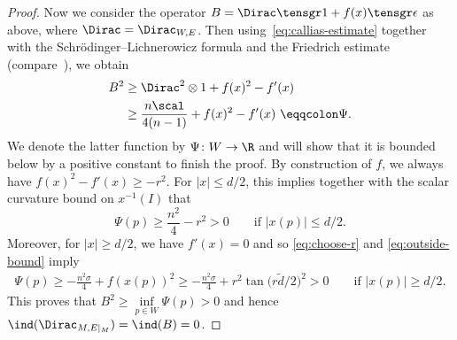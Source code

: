 \begin{proof}
 Now we consider the operator
 \(
 B = \Dirac \tensgr 1 + f(x) \tensgr \epsilon
 \)
 as above, where \(\Dirac = \Dirac_{W,E}\).
 Then \linebreak using~\eqref{eq:callias-estimate} together with the Schr\"odinger--Lichnerowicz formula and the Friedrich estimate (compare~\cite[Section~3.2]{Cecchini:LongNeck}), we obtain
 \begin{align*}
 B^2 &\geq \Dirac^2 \otimes 1 + f(x)^2 - f'(x) \\
 &\geq {\frac{n \scal}{4(n-1)} + f(x)^2 - f'(x)}\ \eqqcolon \Psi.
 \end{align*}
 We denote the latter function by \(\Psi \colon W \to \R\) and will show that it is bounded below by a positive constant to finish the proof.
 By construction of \(f\), we always have \(f(x)^2 - f'(x) \geq -r^2\).
 For \(|x| \leq d/2\), this implies together with the scalar curvature bound on \(x^{-1}(I)\) that
 \[
 \Psi(p) \geq \frac{n^2}{4} - r^2 > 0 \qquad \text{if \(|x(p)| \leq d/2\).}
 \]
 Moreover, for \(|x| \geq d/2\), we have \(f'(x) = 0\) and so \eqref{eq:choose-r} and \eqref{eq:outside-bound} imply
 \begin{align*}
\Psi(p) \geq - \frac{n^2 \sigma}{4} + f(x(p))^2 \geq - \frac{n^2 \sigma}{4} + r^2 \tan\big(r \tilde{d} / 2\big)^2 > 0 \qquad \text{if \(|x(p)| \geq d/2\).}
 \end{align*}
 This proves that \(B^2 \geq \inf\limits_{p \in W} \Psi(p) > 0\) and hence \(\ind(\Dirac_{M, E|_M}) = \ind(B) = 0\).
 \end{proof}
